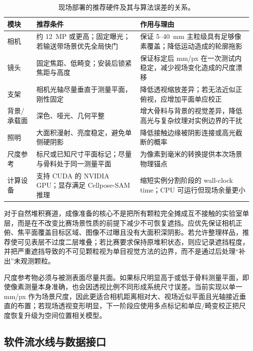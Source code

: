 \begin{table}[htbp]
\centering
\caption{现场部署的推荐硬件及其与算法误差的关系。}
\label{tab:deployment-hardware}
\small
\renewcommand{\arraystretch}{1.15}
\begin{tabular}{>{\raggedright\arraybackslash}p{2.1cm}>{\raggedright\arraybackslash}p{4.0cm}>{\raggedright\arraybackslash}p{7.5cm}}
\toprule
模块 & 推荐条件 & 作用与理由 \\
\midrule
相机 & 约 12~MP 或更高；固定曝光；若输送带场景优先全局快门 & 保证 5--40~mm 主粒级具有足够像素覆盖；降低运动造成的轮廓拖影 \\
镜头 & 固定焦距、低畸变；安装后锁紧焦距与高度 & 保证标定后 mm/px 在一次测试内稳定，减少视场变化造成的尺度漂移 \\
支架 & 相机光轴尽量垂直于测量平面，刚性固定 & 降低透视缩放差异；若无法近似正俯视，应增加平面单应校正 \\
背景/承载面 & 深色、哑光、几何平整 & 增大骨料与背景的视觉差异，降低高光与复杂纹理对实例边界的干扰 \\
照明 & 大面积漫射、亮度稳定，避免单侧硬阴影 & 降低接触边缘被阴影连接或高光截断的概率 \\
尺度参考 & 标尺或已知尺寸平面标记；尽量与骨料处于同一测量平面 & 为像素到毫米的转换提供本次场景物理锚点 \\
计算设备 & 支持 CUDA 的 NVIDIA GPU；显存满足 Cellpose-SAM 推理 & 缩短实例分割阶段的 wall-clock time；CPU 可运行但现场余量更小 \\
\bottomrule
\end{tabular}
\end{table}

对于自然堆积赛道，成像准备的核心不是把所有颗粒完全摊成互不接触的实验室单层，而是在不改变比赛场景性质的前提下减少不可恢复遮挡。应优先保证相机正俯、焦平面覆盖目标区域、图像不过曝且没有大面积深阴影。若允许整理样品，推荐使可见表层不过度二层堆叠；若比赛要求保持原堆积状态，则应记录遮挡程度，并把严重遮挡导致的不可见颗粒视为单目视觉方法的边界，而不是通过后处理“补出”未观测颗粒。

尺度参考物必须与被测表面尽量共面。如果标尺明显高于或低于骨料测量平面，即使像素测量本身准确，也会因透视比例不同形成系统尺寸误差。当前实现以单一 mm/px 作为场景尺度，因此更适合相机距离相对大、视场近似平面且光轴接近垂直的布置；若现场透视变形明显，下一阶段应使用多点标记和单应/畸变校正把尺度恢复升级为空间位置相关模型。

\subsection{软件流水线与数据接口}
\label{sec:deployment-software}

